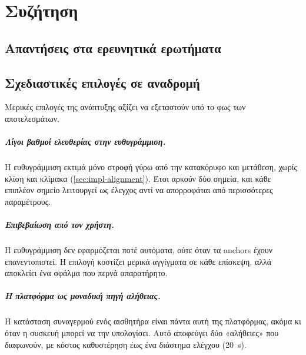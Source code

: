 \chapter{Συζήτηση}
\label{ch:discussion}

\section{Απαντήσεις στα ερευνητικά ερωτήματα}
\label{sec:answers}


\section{Σχεδιαστικές επιλογές σε αναδρομή}
\label{sec:design-retrospective}

Μερικές επιλογές της ανάπτυξης αξίζει να εξεταστούν υπό το φως των αποτελεσμάτων.

\paragraph{Λίγοι βαθμοί ελευθερίας στην ευθυγράμμιση.} Η ευθυγράμμιση εκτιμά μόνο στροφή γύρω από την κατακόρυφο και μετάθεση, χωρίς κλίση και κλίμακα (\cref{sec:impl-alignment}). Έτσι αρκούν δύο σημεία, και κάθε επιπλέον σημείο λειτουργεί ως έλεγχος αντί να απορροφάται από περισσότερες παραμέτρους. 

\paragraph{Επιβεβαίωση από τον χρήστη.} Η ευθυγράμμιση δεν εφαρμόζεται ποτέ αυτόματα, ούτε όταν τα anchors έχουν επανεντοπιστεί. Η επιλογή κοστίζει μερικά αγγίγματα σε κάθε επίσκεψη, αλλά αποκλείει ένα σφάλμα που περνά απαρατήρητο. 

\paragraph{Η πλατφόρμα ως μοναδική πηγή αλήθειας.} Η κατάσταση συναγερμού ενός αισθητήρα είναι πάντα αυτή της πλατφόρμας, ακόμα κι όταν η συσκευή μπορεί να την υπολογίσει. Αυτό αποφεύγει δύο «αλήθειες» που διαφωνούν, με κόστος καθυστέρηση έως ένα διάστημα ελέγχου (\SI{20}{s}).

